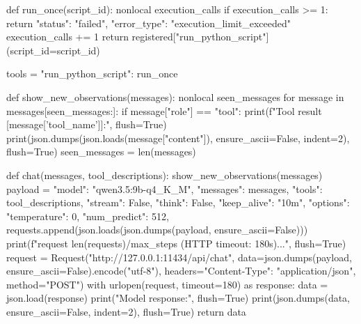 \begin{Code}
    def run_once(script_id):
        nonlocal execution_calls
        if execution_calls >= 1:
            return {"status": "failed", "error_type": "execution_limit_exceeded"}
        execution_calls += 1
        return registered["run_python_script"](script_id=script_id)

    tools = {"run_python_script": run_once}

    def show_new_observations(messages):
        nonlocal seen_messages
        for message in messages[seen_messages:]:
            if message["role"] == "tool":
                print(f"Tool result [{message['tool_name']}]:", flush=True)
                print(json.dumps(json.loads(message["content"]), ensure_ascii=False, indent=2), flush=True)
        seen_messages = len(messages)

    def chat(messages, tool_descriptions):
        show_new_observations(messages)
        payload = {
            "model": "qwen3.5:9b-q4_K_M", "messages": messages, "tools": tool_descriptions,
            "stream": False, "think": False, "keep_alive": "10m",
            "options": {"temperature": 0, "num_predict": 512},
        }
        requests.append(json.loads(json.dumps(payload, ensure_ascii=False)))
        print(f"\nModel request {len(requests)}/{max_steps} (HTTP timeout: 180s)...", flush=True)
        request = Request("http://127.0.0.1:11434/api/chat",
                          data=json.dumps(payload, ensure_ascii=False).encode("utf-8"),
                          headers={"Content-Type": "application/json"}, method="POST")
        with urlopen(request, timeout=180) as response:
            data = json.load(response)
        print("Model response:", flush=True)
        print(json.dumps(data, ensure_ascii=False, indent=2), flush=True)
        return data


\end{Code}
